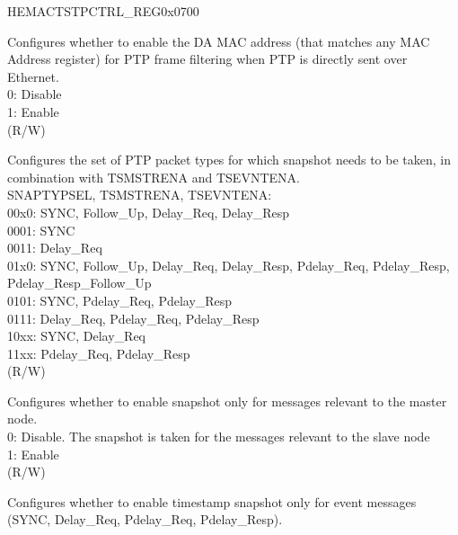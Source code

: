 \begin{register}{H}{EMACTSTPCTRL\_REG}{0x0700}\label{regdesc:EMACTIMESTAMPCONTROLREG}
%
%
%
%
%
%
%
%
%
%
%
%
%
%
%
%
%
%
\regnewline%
\begin{regdesc}\begin{reglist}
\item [TSENMACADDR] Configures whether to enable the DA MAC address (that matches any MAC Address register) for PTP frame filtering when PTP is directly sent over Ethernet.\\
0: Disable\\
1: Enable\\ (R/W)
\item [SNAPTYPSEL] Configures the set of PTP packet types for which snapshot needs to be taken, in combination with TSMSTRENA and TSEVNTENA.\\
SNAPTYPSEL, TSMSTRENA, TSEVNTENA:\\
00x0: SYNC, Follow\_Up, Delay\_Req, Delay\_Resp\\
0001: SYNC\\
0011: Delay\_Req\\
01x0: SYNC, Follow\_Up, Delay\_Req, Delay\_Resp, Pdelay\_Req, Pdelay\_Resp, Pdelay\_Resp\_Follow\_Up\\
0101: SYNC, Pdelay\_Req, Pdelay\_Resp\\
0111: Delay\_Req, Pdelay\_Req, Pdelay\_Resp\\
10xx: SYNC, Delay\_Req\\
11xx: Pdelay\_Req, Pdelay\_Resp\\
(R/W)
\item [TSMSTRENA] Configures whether to enable snapshot only for messages relevant to the master node.\\
0: Disable. The snapshot is taken for the messages relevant to the slave node\\
1: Enable\\ (R/W)
\item [TSEVNTENA] Configures whether to enable timestamp snapshot only for event messages (SYNC, Delay\_Req, Pdelay\_Req, Pdelay\_Resp).\\

\end{reglist}
\end{regdesc}
\end{register}
